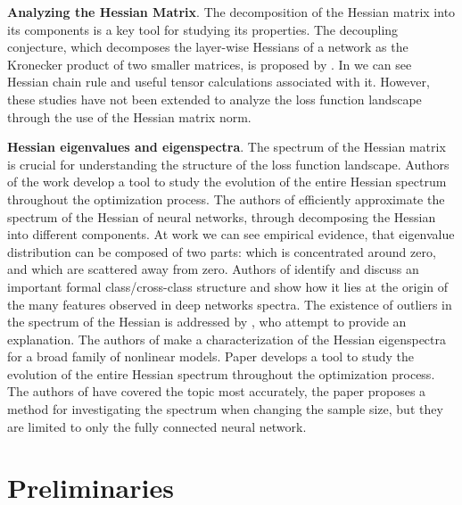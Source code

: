 \documentclass[conference]{IEEEtran}
\begin{document}
\textbf{Analyzing the Hessian Matrix}.
The decomposition of the Hessian matrix into its components is a key tool for studying its properties.
The decoupling conjecture, which decomposes the layer-wise Hessians of a network as the Kronecker product of two smaller matrices, is proposed by \cite{DissectingHessian}. In \cite{skorski2019chainruleshessianhigher} we can see Hessian chain rule and useful tensor calculations associated with it. However, these studies have not been extended to analyze the loss function landscape through the use of the Hessian matrix norm.

\textbf{Hessian eigenvalues and eigenspectra}.
The spectrum of the Hessian matrix is crucial for understanding the structure of the loss function landscape.
Authors of the work \cite{investigation_neural_net_eigen} develop a tool to study
the evolution of the entire Hessian spectrum
throughout the optimization process. The authors of \cite{papyan2019spectrumdeepnethessiansscale} efficiently approximate the spectrum of the Hessian of neural networks, through decomposing the Hessian into different components. At work \cite{sagun2017eigenvalueshessiandeeplearning} we can see empirical evidence, that eigenvalue distribution can be composed of two parts: which is concentrated around zero, and which are scattered away from zero. Authors of \cite{papyan2020tracesclasscrossclassstructurepervade} identify and discuss an important formal class/cross-class structure and show how it lies at the origin of the many features observed in deep networks spectra.
The existence of outliers in the spectrum of the Hessian is addressed by \cite{papyan2019measurementsthreelevelhierarchicalstructure}, who attempt to provide an explanation.
The authors of \cite{liao2021hessianeigenspectrarealisticnonlinear} make a characterization of the
Hessian eigenspectra for a broad family of nonlinear models.
Paper \cite{azadbakht2022drasticallyreducingnumbertrainable} develops a
tool to study the evolution of the entire Hessian spectrum throughout the optimization process.
The authors of \cite{kiselev2024unravelinghessiankeysmooth} have covered the topic most accurately, the paper proposes a method for investigating the spectrum when changing the sample size, but they are limited to only the fully connected neural network.



\section{Preliminaries}\label{sec:prelim}
\end{document}
